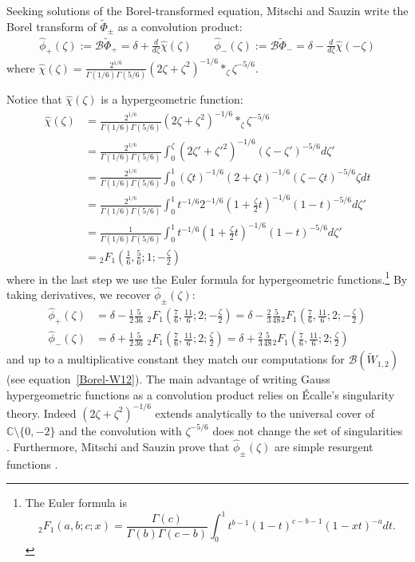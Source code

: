 \documentclass{article}
\newcommand{\C}{\mathbb{C}}
\newcommand{\series}[1]{\tilde{#1}}
\newcommand{\borel}{\mathcal{B}}
\theoremstyle{definition}
\theoremstyle{plain}
\begin{document}
Seeking solutions of the Borel-transformed equation, Mitschi and Sauzin write the Borel transform of $\series{\Phi}_{\pm}$ as a convolution product:
\begin{align*}
\hat{\phi}_+(\zeta):=\borel\series{\Phi}_+=\delta+\frac{d}{d\zeta}\hat{\chi}(\zeta)  \qquad \hat{\phi}_-(\zeta):=\borel\series{\Phi}_-=\delta-\frac{d}{d\zeta}\hat{\chi}(-\zeta)
\end{align*}
 where $\hat{\chi}(\zeta)=\frac{2^{1/6}}{\Gamma(1/6)\Gamma(5/6)}(2\zeta+\zeta^2)^{-1/6} \ast_\zeta \zeta^{-5/6}$.

Notice that $\hat{\chi}(\zeta)$ is a hypergeometric function:
\begin{align*}
\hat{\chi}(\zeta)&=\frac{2^{1/6}}{\Gamma(1/6)\Gamma(5/6)}(2\zeta+\zeta^2)^{-1/6}\ast_\zeta \zeta^{-5/6}\\
&=\frac{2^{1/6}}{\Gamma(1/6)\Gamma(5/6)}\int_0^{\zeta}(2\zeta'+\zeta'^2)^{-1/6} (\zeta-\zeta')^{-5/6}d\zeta'\\
&=\frac{2^{1/6}}{\Gamma(1/6)\Gamma(5/6)}\int_0^{1}(\zeta t)^{-1/6}(2+\zeta t)^{-1/6} (\zeta-\zeta t)^{-5/6} \zeta dt\\
&=\frac{2^{1/6}}{\Gamma(1/6)\Gamma(5/6)}\int_0^{1} t^{-1/6} 2^{-1/6}(1+\frac{\zeta}{2} t)^{-1/6} (1-t)^{-5/6}d\zeta'\\
&=\frac{1}{\Gamma(1/6)\Gamma(5/6)}\int_0^{1} t^{-1/6} (1+\frac{\zeta}{2} t)^{-1/6} (1-t)^{-5/6}d\zeta'\\
&={}_2F_1\left(\frac{1}{6},\frac{5}{6};1;-\frac{\zeta}{2}\right)
\end{align*}
where in the last step we use the Euler formula for hypergeometric functions.\footnote{The Euler formula is \begin{equation}\label{Euler formula}
{}_{2}F_1\left(a,b;c;x\right)=\frac{\Gamma(c)}{\Gamma(b)\Gamma(c-b)}\int_0^1 t^{b-1}(1-t)^{c-b-1}(1-xt)^{-a}dt.
\end{equation}} By taking derivatives, we recover $\hat{\phi}_{\pm}(\zeta)$: 
\begin{align*}
\hat{\phi}_+(\zeta)&=\delta-\frac{1}{2}\frac{5}{36}\,\, {}_2F_1\left(\frac{7}{6},\frac{11}{6};2;-\frac{\zeta}{2}\right)=\delta-\frac{2}{3}\frac{5}{48} {}_2F_1\left(\frac{7}{6},\frac{11}{6};2;-\frac{\zeta}{2}\right)\\
\hat{\phi}_-(\zeta)&=\delta+\frac{1}{2}\frac{5}{36}\,\, {}_2F_1\left(\frac{7}{6},\frac{11}{6};2;\frac{\zeta}{2}\right)=\delta+\frac{2}{3}\frac{5}{48} {}_2F_1\left(\frac{7}{6},\frac{11}{6};2;\frac{\zeta}{2}\right)
\end{align*} 
and up to a multiplicative constant they match our computations for $\borel(\tilde{W}_{1,2})$ (see equation~\eqref{Borel-W12}).
The main advantage of writing Gauss hypergeometric functions as a convolution product relies on \'Ecalle's singularity theory. Indeed $(2\zeta+\zeta^2)^{-1/6}$ extends analytically to the universal cover of $\C\setminus\lbrace 0,-2\rbrace$ and the convolution with $\zeta^{-5/6}$ does not change the set of singularities \cite[Section~6.14.5(c)]{diverg-resurg-i}. Furthermore, Mitschi and Sauzin prove that $\hat{\phi}_{\pm}(\zeta)$ are simple resurgent functions \cite[Lemma 6.106]{diverg-resurg-i}. %
%
\end{document}
